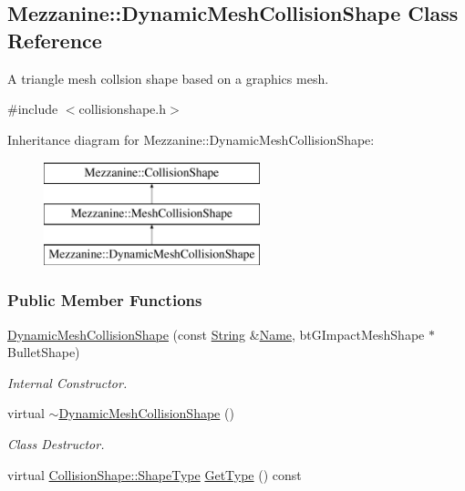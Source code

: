 \hypertarget{classMezzanine_1_1DynamicMeshCollisionShape}{
\subsection{Mezzanine::DynamicMeshCollisionShape Class Reference}
\label{classMezzanine_1_1DynamicMeshCollisionShape}
}


A triangle mesh collsion shape based on a graphics mesh.  




{\ttfamily \#include $<$collisionshape.h$>$}

Inheritance diagram for Mezzanine::DynamicMeshCollisionShape:\begin{figure}[H]
\begin{center}
\leavevmode
\includegraphics[height=3.000000cm]{classMezzanine_1_1DynamicMeshCollisionShape}
\end{center}
\end{figure}
\subsubsection*{Public Member Functions}
\begin{DoxyCompactItemize}
\item 
\hyperlink{classMezzanine_1_1DynamicMeshCollisionShape_a246dd3621bfd4e36ffd73cf3648dd7c5}{DynamicMeshCollisionShape} (const \hyperlink{namespaceMezzanine_acf9fcc130e6ebf08e3d8491aebcf1c86}{String} \&\hyperlink{classMezzanine_1_1CollisionShape_aac524c5c56fa4d158bc071f8aecfbe79}{Name}, btGImpactMeshShape $\ast$BulletShape)
\begin{DoxyCompactList}\small\item\em Internal Constructor. \item\end{DoxyCompactList}\item 
\hypertarget{classMezzanine_1_1DynamicMeshCollisionShape_a41204636fc0a0dba46fbc52c59cd08c6}{
virtual \hyperlink{classMezzanine_1_1DynamicMeshCollisionShape_a41204636fc0a0dba46fbc52c59cd08c6}{$\sim$DynamicMeshCollisionShape} ()}
\label{classMezzanine_1_1DynamicMeshCollisionShape_a41204636fc0a0dba46fbc52c59cd08c6}

\begin{DoxyCompactList}\small\item\em Class Destructor. \item\end{DoxyCompactList}\item 
virtual \hyperlink{classMezzanine_1_1CollisionShape_ad04186055565998879b64176d6dd100d}{CollisionShape::ShapeType} \hyperlink{classMezzanine_1_1DynamicMeshCollisionShape_ae323a4ac9ae12890e1f8ce82b22f1ccc}{GetType} () const 
\end{DoxyCompactItemize}
